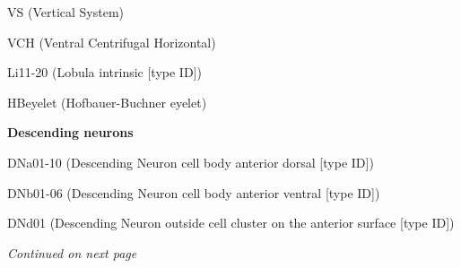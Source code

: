 \documentclass{article}
\begin{document}
{\noindent\hspace*{1.0em}VS (Vertical System)\par
\noindent\hspace*{1.0em}VCH (Ventral Centrifugal Horizontal)\par
\noindent\hspace*{1.0em}Li11-20 (Lobula intrinsic [type ID])\par
\noindent\hspace*{1.0em}HBeyelet (Hofbauer-Buchner eyelet)\par
\noindent\textbf{Descending neurons}\par
\noindent\hspace*{1.0em}DNa01-10 (Descending Neuron cell body anterior dorsal [type ID])\par
\noindent\hspace*{1.0em}DNb01-06 (Descending Neuron cell body anterior ventral [type ID])\par
\noindent\hspace*{1.0em}DNd01 (Descending Neuron outside cell cluster on the anterior surface [type ID])\par
}
\noindent\emph{Continued on next page}
\end{document}
